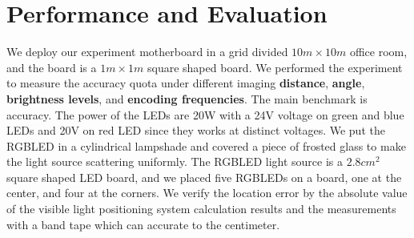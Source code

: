 \documentclass[conference]{IEEEtran}
\begin{document}
\begin{figure}
	\footnotesize
\end{figure}

\section{\textbf{Performance and Evaluation}}

We deploy our experiment motherboard in a grid divided $10m \times 10m$ office room, and the board is a $1m \times 1m$ square shaped board. We performed the experiment to measure the accuracy quota under different imaging \textbf{distance}, \textbf{angle}, \textbf{brightness levels}, and \textbf{encoding frequencies}. The main benchmark is accuracy. The power of the LEDs are 20W with a 24V voltage on green and blue LEDs and 20V on red LED since they works at distinct voltages. We put the RGBLED in a cylindrical lampshade and covered a piece of frosted glass to make the light source scattering uniformly. The RGBLED light source is a $2.8cm^2$ square shaped LED board, and we placed five RGBLEDs on a board, one at the center, and four at the corners. We verify the location error by the absolute value of the visible light positioning system calculation results and the measurements with a band tape which can accurate to the centimeter. 
\end{document}
